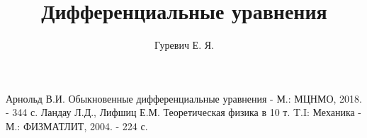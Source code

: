 \documentclass{article}
\author{Гуревич Е. Я.}
\title{Дифференциальные уравнения}
\date{}
\begin{document}
%
\maketitle
\tableofcontents
\newpage












\begin{thebibliography}{3}
Арнольд В.И. Обыкновенные дифференциальные уравнения - М.: МЦНМО, 2018. - 344 с.
Ландау Л.Д., Лифшиц Е.М. Теоретическая физика в 10 т. T.I: Механика - М.:
ФИЗМАТЛИТ, 2004. - 224 с.
\end{thebibliography}
\end{document}
